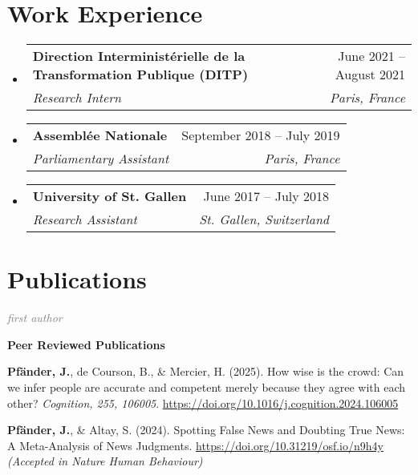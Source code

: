 \documentclass[letterpaper,11pt]{article}
\makeatletter
\newcommand{\resumeItem}[1]{
  \item\small{
    {#1 \vspace{-2pt}}
  }
}
\newcommand{\resumeSubheading}[4]{
  \vspace{1pt}\item
    \begin{tabular*}{0.97\textwidth}[t]{l@{\extracolsep{\fill}}r}
      \textbf{#1} & #2 \\
      \textit{\small#3} & \textit{\small #4} \\
    \end{tabular*}\vspace{-7pt}
}
\newcommand{\resumeSubSubheading}[2]{
    \item
    \begin{tabular*}{0.97\textwidth}{l@{\extracolsep{\fill}}r}
      \textit{\small#1} & \textit{\small #2} \\
    \end{tabular*}\vspace{-7pt}
}
\newcommand{\resumePublicationHeading}[1]{
  \vspace{5pt} %
  \noindent\textbf{\small #1} %
  \vspace{2pt} %
}
\newcommand{\resumeSubHeadingListStart}{\begin{itemize}[leftmargin=0.15in, label={}]}
\newcommand{\resumeSubHeadingListEnd}{\end{itemize}}
\newcommand{\resumeItemListStart}{\begin{itemize}}
\newcommand{\resumeItemListEnd}{\end{itemize}\vspace{-5pt}}
\makeatother
\begin{document}
\section{Work Experience}
  \resumeSubHeadingListStart

    \resumeSubheading
      {Direction Interministérielle de la Transformation Publique (DITP)}{June 2021 -- August 2021}
      {Research Intern}{Paris, France}
      
    \resumeSubheading
      {Assemblée Nationale}{September 2018 -- July 2019}
      {Parliamentary Assistant}{Paris, France}

    \resumeSubheading
      {University of St. Gallen}{June 2017 -- July 2018}
      {Research Assistant}{St. Gallen, Switzerland}
      

  \resumeSubHeadingListEnd

\section{Publications}


\small

\noindent\textcolor{gray}{\textit{\footnotemark[1]first author}}
\vspace{5pt} %

\resumePublicationHeading{Peer Reviewed Publications}
\begin{enumerate}[label={[{\arabic*.}]}, left=0.15in]
    \resumeItem{\textbf{Pfänder, J.\footnotemark[1]}, de Courson, B., & Mercier, H. (2025). How wise is the crowd: Can we infer people are accurate and competent merely because they agree with each other? \emph{Cognition, 255, 106005}. \url{https://doi.org/10.1016/j.cognition.2024.106005}
    }
    \resumeItem{\textbf{Pfänder, J.\footnotemark[1]}, \& Altay, S. (2024). Spotting False News and Doubting True News: A Meta-Analysis of News Judgments. \url{https://doi.org/10.31219/osf.io/n9h4y} \emph{(Accepted in Nature Human Behaviour)}
    }
\end{enumerate}
\end{document}
